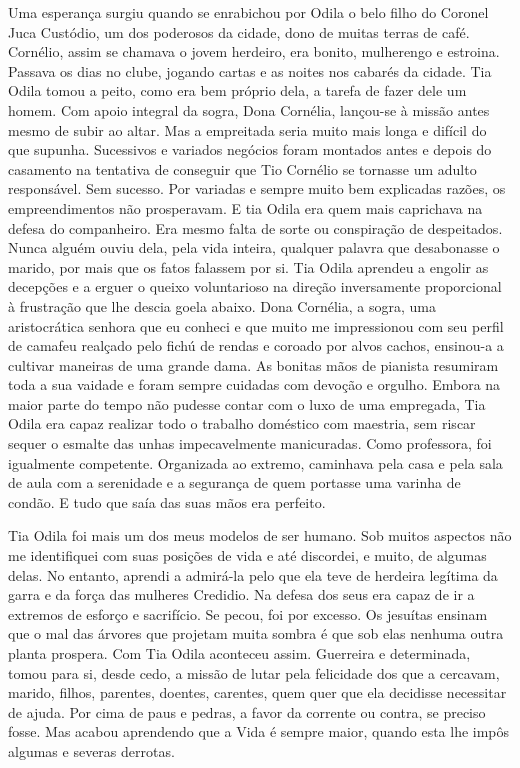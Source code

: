 Uma esperança surgiu quando se enrabichou por Odila o belo filho do Coronel Juca Custódio, um dos poderosos da cidade, dono de muitas terras de café.
Cornélio, assim se chamava o jovem herdeiro, era bonito, mulherengo e estroina.
Passava os dias no clube, jogando cartas e as noites nos cabarés da cidade.
Tia Odila tomou a peito, como era bem próprio dela, a tarefa de fazer dele um homem.
Com apoio integral da sogra, Dona Cornélia, lançou-se à missão antes mesmo de subir ao altar.
Mas a empreitada seria muito mais longa e difícil do que supunha.
Sucessivos e variados negócios foram montados antes e depois do casamento na tentativa de conseguir que Tio Cornélio se tornasse um adulto responsável.
Sem sucesso.
Por variadas e sempre muito bem explicadas razões, os empreendimentos não prosperavam.
E tia Odila era quem mais caprichava na defesa do companheiro.
Era mesmo falta de sorte ou conspiração de despeitados.
Nunca alguém ouviu dela, pela vida inteira, qualquer palavra que desabonasse o marido, por mais que os fatos falassem por si.
Tia Odila aprendeu a engolir as decepções e a erguer o queixo voluntarioso na direção inversamente proporcional à frustração que lhe descia goela abaixo.
Dona Cornélia, a sogra, uma aristocrática senhora que eu conheci e que muito me impressionou com seu perfil de camafeu realçado pelo fichú de rendas e coroado por alvos cachos, ensinou-a a cultivar maneiras de uma grande dama.
As bonitas mãos de pianista resumiram toda a sua vaidade e foram sempre cuidadas com devoção e orgulho.
Embora na maior parte do tempo não pudesse contar com o luxo de uma empregada, Tia Odila era capaz realizar todo o trabalho doméstico com maestria, sem riscar sequer o esmalte das unhas impecavelmente manicuradas.
Como professora, foi igualmente competente.
Organizada ao extremo, caminhava pela casa e pela sala de aula com a serenidade e a segurança de quem portasse uma varinha de condão.
E tudo que saía das suas mãos era perfeito.


Tia Odila foi mais um dos meus modelos de ser humano.
Sob muitos aspectos não me identifiquei com suas posições de vida e até discordei, e muito, de algumas delas.
No entanto, aprendi a admirá-la pelo que ela teve de herdeira legítima da garra e da força das mulheres Credidio.
Na defesa dos seus era capaz de ir a extremos de esforço e sacrifício.
Se pecou, foi por excesso.
Os jesuítas ensinam que o mal das árvores que projetam muita sombra é que sob elas nenhuma outra planta prospera.
Com Tia Odila aconteceu assim.
Guerreira e determinada, tomou para si, desde cedo, a missão de lutar pela felicidade dos que a cercavam, marido, filhos, parentes, doentes, carentes, quem quer que ela decidisse necessitar de ajuda.
Por cima de paus e pedras, a favor da corrente ou contra, se preciso fosse.
Mas acabou aprendendo que a Vida é sempre maior, quando esta lhe impôs algumas e severas derrotas.

